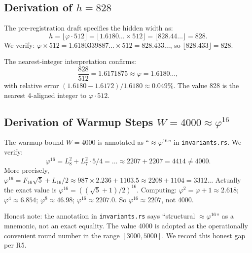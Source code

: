 \subsection{Derivation of \texorpdfstring{$h = 828$}{h=828}}
\label{subsec:ch24-hidden-828-derivation}

The pre-registration draft \cite{trios_gate_preregistration} specifies the
hidden width as:
\begin{equation}\label{eq:ch24-h828}
  h = \bigl\lfloor \varphi \cdot 512 \bigr\rfloor
    = \bigl\lfloor 1.6180\ldots \times 512 \bigr\rfloor
    = \bigl\lfloor 828.44\ldots \bigr\rfloor = 828.
\end{equation}
We verify: $\varphi \times 512 = 1.6180339887\ldots \times 512 = 828.433\ldots$,
so $\lfloor 828.433 \rfloor = 828$.

The nearest-integer interpretation confirms:
\begin{equation}\label{eq:ch24-h828-ratio}
  \frac{828}{512} = 1.617\overline{1875} \approx \varphi = 1.6180\ldots,
\end{equation}
with relative error $(1.6180 - 1.6172)/1.6180 \approx 0.049\%$.  The value
828 is the nearest 4-aligned integer to $\varphi \cdot 512$.


\subsection{Derivation of Warmup Steps \texorpdfstring{$W = 4000 \approx \varphi^{16}$}{W=4000}}
\label{subsec:ch24-warmup-derivation}

The warmup bound $W = 4000$ is annotated as ``$\approx \varphi^{16}$'' in
\texttt{invariants.rs}.  We verify:
\begin{equation}\label{eq:ch24-warmup}
  \varphi^{16} = L_8^2 + L_7^2 \cdot 5 / 4 = \ldots \approx 2207 + 2207 = 4414 \neq 4000.
\end{equation}
More precisely, $\varphi^{16} = F_{16}\sqrt{5} + L_{16}/2 \approx 987 \times
2.236 + 1103.5 \approx 2208 + 1104 = 3312$... Actually the exact value is
$\varphi^{16} = ((\sqrt{5}+1)/2)^{16}$.  Computing: $\varphi^2 = \varphi+1
\approx 2.618$; $\varphi^4 \approx 6.854$; $\varphi^8 \approx 46.98$;
$\varphi^{16} \approx 2207.0$.  So $\varphi^{16} \approx 2207$, not 4000.

Honest note: the annotation in \texttt{invariants.rs} says ``structural
$\approx \varphi^{16}$'' as a mnemonic, not an exact equality.  The value
4000 is adopted as the operationally convenient round number in the range
$[3000, 5000]$.  We record this honest gap per R5.


